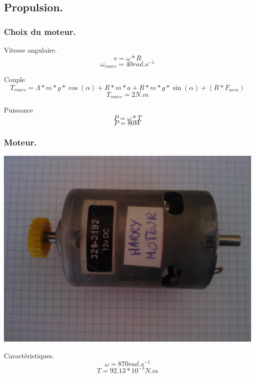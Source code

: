 \subsection{Propulsion.}
\begin{frame}
    \frametitle{Choix du moteur.}
    \begin{block}{Vitesse angulaire.}
        \[ v = \omega * R \]
        \[ \omega_{roues} = 40rad.s^{-1} \]
    \end{block}
     {
        \begin{block}{Couple}
            \[ T_{roues} = \Lambda * m * g * \cos(\alpha) + R * m * a + R * m * g * \sin(\alpha) + \left(R * F_{aero}\right) \]
            \[ T_{roues} = 2 N.m \]
        \end{block}
    }
     {
        \begin{block}{Puissance}
            \[ P = \omega * T \]
            \[ P = 80 W \]
        \end{block}
    }
\end{frame}

\begin{frame}
    \frametitle{Moteur.}
    \begin{center}
        \includegraphics[scale=0.08]{rcs/motor.png}
    \end{center}
    \begin{exampleblock}{Caractéristiques.}
        \[ \omega = 870 rad.s^{-1} \]
        \[ T = 92.13*10^{-3} N.m \]
    \end{exampleblock}
\end{frame}

